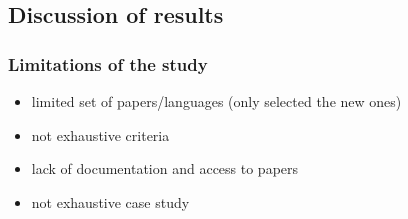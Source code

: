 \subsection{Discussion of results}\label{subsec:evaluation-discussion-of-results}

\subsubsection{Limitations of the study}
\begin{itemize}
    \item limited set of papers/languages (only selected the new ones)
    \item not exhaustive criteria
    \item lack of documentation and access to papers
    \item not exhaustive case study
\end{itemize}


